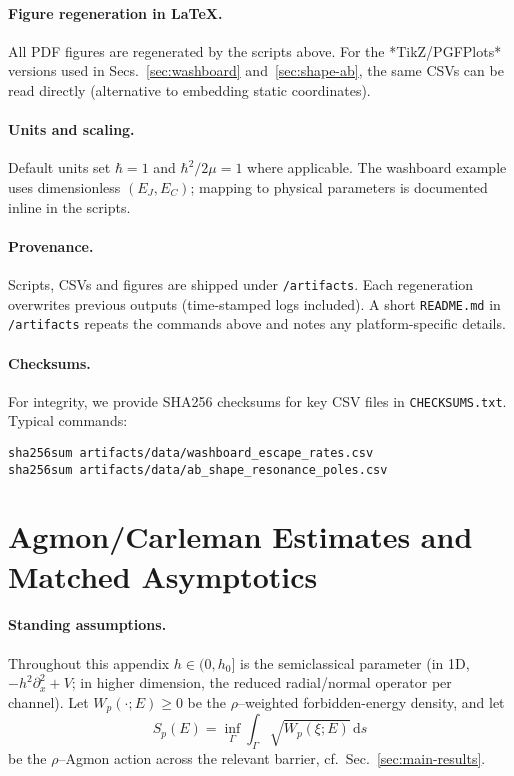\documentclass[11pt]{article}
\theoremstyle{definition}
\begin{document}
    \paragraph{Figure regeneration in \LaTeX.}
    All PDF figures are regenerated by the scripts above. For the *TikZ/PGFPlots* versions used in Secs.~\ref{sec:washboard} and~\ref{sec:shape-ab}, the same CSVs can be read directly (alternative to embedding static coordinates).
    
    \paragraph{Units and scaling.}
    Default units set $\hbar=1$ and $\hbar^2/2\mu=1$ where applicable. 
    The washboard example uses dimensionless \((E_J,E_C)\); mapping to physical parameters is documented inline in the scripts.
    
    \paragraph{Provenance.}
    Scripts, CSVs and figures are shipped under \texttt{/artifacts}. Each regeneration overwrites previous outputs (time-stamped logs included). 
    A short \texttt{README.md} in \texttt{/artifacts} repeats the commands above and notes any platform-specific details.
    
    
    \paragraph{Checksums.} For integrity, we provide SHA256 checksums for key CSV files in \texttt{CHECKSUMS.txt}. Typical commands:
\begin{verbatim}
sha256sum artifacts/data/washboard_escape_rates.csv
sha256sum artifacts/data/ab_shape_resonance_poles.csv
\end{verbatim}
\appendix
    
    \section{Agmon/Carleman Estimates and Matched Asymptotics}
    \label{app:agmon}
    
    \paragraph{Standing assumptions.}
    Throughout this appendix $h\in(0,h_0]$ is the semiclassical parameter (in 1D, $-h^2\partial_x^2+V$; in higher dimension, the reduced radial/normal operator per channel). 
    Let $W_p(\cdot;E)\ge 0$ be the $\rho$–weighted forbidden-energy density, and let
    \[
    S_p(E)=\inf_{\Gamma}\int_\Gamma \sqrt{W_p(\xi;E)}\,\mathrm{d}s
    \]
    be the $\rho$–Agmon action across the relevant barrier, cf.\ Sec.~\ref{sec:main-results}.
    
\end{document}

